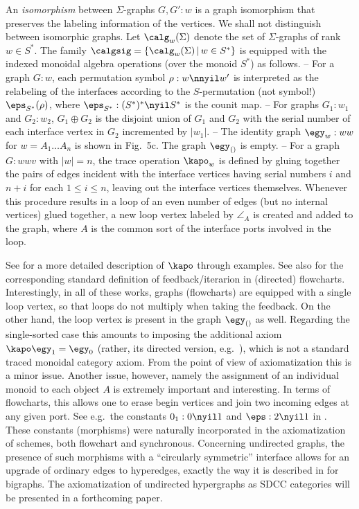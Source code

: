 \documentclass{eptcs}
\begin{document}
An {\em isomorphism\/} between $\Sigma $-graphs $G,G':w$ is a graph isomorphism that
preserves the labeling information of the vertices. We shall not distinguish between
isomorphic graphs. Let $\calg _w(\Sigma )$ denote the set of $\Sigma $-graphs
of rank $w\in S^*$. The family $\calgsig =\{ \calg _w(\Sigma )\,|\,w\in S^*\}$ is
equipped with the indexed monoidal algebra operations (over the monoid $S^*$) 
as follows.
\vsp\newline
-- For a graph $G:w$, each permutation symbol $\rho :w\nnyil w'$ is interpreted as
the relabeling of the interfaces according to the $S$-permutation (not symbol!)
$\eps _{S^*}(\rho )$, where $\eps _{S^*}: (S^*)^*\nyil S^*$ is the counit map.
\newline
-- For graphs $G_1:w_1$ and $G_2:w_2$, $G_1\oplus G_2$ is the disjoint union of
$G_1$ and $G_2$ with the serial number of each interface vertex in $G_2$ incremented by
$|w_1|$.
\newline
-- The identity graph $\egy _w:ww$ for $w=A_1\ldots A_n$ is shown in Fig.~5c. The graph
$\egy _{()}$ is empty.
\newline
-- For a graph $G:wwv$ with $|w|=n$, the trace operation $\kapo _w$ is defined by gluing 
together the pairs of edges incident with the interface vertices having serial numbers 
$i$ and $n+i$ for each $1\leq i\leq n$, leaving out the interface vertices themselves. 
Whenever this procedure results in a loop of an even number of edges
(but no internal vertices) glued together,
a new loop vertex labeled by $\angle _A$ is created and added to the graph, where
$A$ is the common sort of the interface ports involved in the loop. 
\vsp

See \cite{hel} for
a more detailed description of $\kapo $ through examples. See also \cite{elg,blo,acta,tcs}
for the corresponding standard definition of feedback/iterarion in (directed) flow\-charts. 
Interestingly,
in all of these works, graphs (flowcharts) are equipped with a single loop vertex, so that
loops do not multiply when taking the feedback. On the other hand, the loop vertex is present in the 
graph $\egy _{()}$ as well. Regarding the single-sorted case
this amounts to imposing the additional axiom $\kapo \egy _1=\egy _0$ (rather, its
directed version, e.g.\ \cite[Axiom S5: $\uparrow 1=0$]{acta}), which is not
a standard traced monoidal category axiom. From the point of view of axiomatization this is a 
minor issue. Another issue, however, namely the assignment of an
individual monoid to each object $A$ is extremely important and interesting.
In terms of flowcharts,
this allows one to erase begin vertices and join two incoming edges at any given port. 
See e.g.\ the constants $0_1:0\nyil 1$ and $\eps:2\nyil 1$ in \cite {acta,tcs}. 
These constants (morphisms) were naturally incorporated in the axiomatization of schemes,
both flowchart and synchronous. Concerning undirected
graphs, the presence of such morphisms with a ``circularly symmetric'' interface allows for
an upgrade of ordinary edges to hyperedges, exactly the way it is described in
\cite{mil} for bigraphs. The axiomatization of undirected hypergraphs as SDCC categories 
will be presented in a forthcoming paper.
\end{document}
